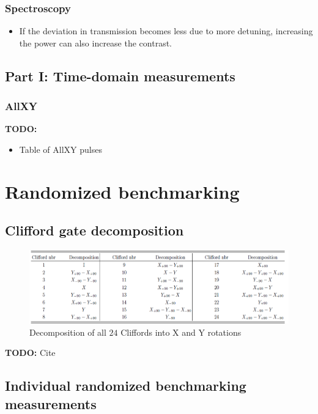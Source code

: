      \subsubsection{Spectroscopy}
        \begin{itemize}
          \item If the deviation in transmission becomes less due to more detuning, increasing the power can also increase the contrast.
        \end{itemize}
    \subsection{Part I: Time-domain measurements}
      \subsubsection{AllXY}
        \label{ssec:AllXY}
        \textbf{TODO:}
        \begin{itemize}
          \item Table of AllXY pulses
        \end{itemize}
  \section{Randomized benchmarking}
    \subsection{Clifford gate decomposition}
      \label{ssec:Clifford gate decomposition}

      \begin{figure}[tb]
        \centering
        \includegraphics[width=\textwidth]{../Figures/Clifford decomposition.png}
        \caption{Decomposition of all $24$ Cliffords into X and Y rotations}
        \label{fig:Clifford decomposition}
      \end{figure}
      \textbf{TODO:} Cite

    \subsection{Individual randomized benchmarking measurements}
      \label{ssec:Individual randomized benchmarking measurements}

